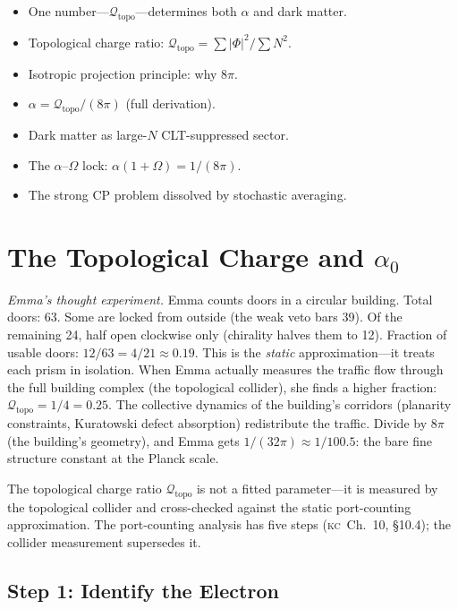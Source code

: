 \documentclass[11pt, a4paper, openany]{book}
\newcommand{\KC}[1]{\textnormal{(\textsc{kc}~#1)}}
\newenvironment{introduction}[1][Modulo Overview]{%
  \begin{tcolorbox}[
    enhanced,colback=structure!5,colframe=structure,
    colbacktitle=structure,coltitle=white,
    fonttitle=\small\bfseries,title={#1},
    arc=2pt,boxrule=0.7pt,
    left=8pt,right=8pt,top=6pt,bottom=6pt,
    before skip=12pt,after skip=12pt
  ]\itshape\begin{itemize}[leftmargin=*,itemsep=2pt,parsep=0pt]
}{%
  \end{itemize}\end{tcolorbox}
}
\begin{document}
\begin{introduction}
  \item One number---$\mathcal{Q}_{\mathrm{topo}}$---determines both $\alpha$ and dark matter.
  \item Topological charge ratio: $\mathcal{Q}_{\mathrm{topo}} = \sum|\Phi|^2/\sum N^2$.
  \item Isotropic projection principle: why $8\pi$.
  \item $\alpha = \mathcal{Q}_{\mathrm{topo}}/(8\pi)$ (full derivation).
  \item Dark matter as large-$N$ CLT-suppressed sector.
  \item The $\alpha$--$\Omega$ lock: $\alpha(1 + \Omega) = 1/(8\pi)$.
  \item The strong CP problem dissolved by stochastic averaging.
\end{introduction}

\section{The Topological Charge and $\alpha_0$}\label{sec:qtopo}

\smallskip\noindent
\textit{Emma's thought experiment.}
Emma counts doors in a circular building. Total doors: 63. Some are
locked from outside (the weak veto bars 39). Of the remaining 24, half
open clockwise only (chirality halves them to 12). Fraction of usable
doors: $12/63 = 4/21 \approx 0.19$. This is the \emph{static}
approximation---it treats each prism in isolation. When Emma actually
measures the traffic flow through the full building complex (the
topological collider), she finds a higher fraction:
$\mathcal{Q}_{\mathrm{topo}} = 1/4 = 0.25$. The collective dynamics of
the building's corridors (planarity constraints, Kuratowski defect
absorption) redistribute the traffic. Divide by $8\pi$ (the
building's geometry), and Emma gets $1/(32\pi) \approx 1/100.5$:
the bare fine structure constant at the Planck scale.
\smallskip

\noindent
The topological charge ratio $\mathcal{Q}_{\mathrm{topo}}$ is not a
fitted parameter---it is measured by the topological collider and
cross-checked against the static port-counting approximation.
The port-counting analysis has five steps
\KC{Ch.~10, \S10.4}; the collider measurement supersedes it.

\subsection{Step 1: Identify the Electron}
\end{document}
